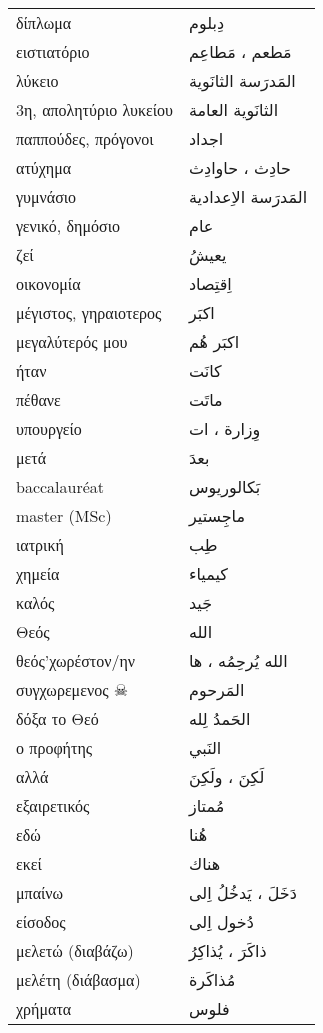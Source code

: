 \documentclass[twocolumn,a4paper]{article}
\newcommand{\ar}[1]{\textarabic{#1}}
\newcommand{\pl}{\raisebox{0.15ex}{\footnotesize ◍}}
\newcommand{\normpl}[1]{\ar{ #1، ات }}
\newcommand{\vrf}{\raisebox{0.15ex}{\footnotesize ◉}}
\newcommand{\vr}{\raisebox{0.15ex}{\footnotesize ◎}}
\newcommand{\mas}{\raisebox{0.15ex}{\footnotesize ◫}}
\begin{document}
\begin{mpsupertabular}{ P{0.5\textwidth} P{0.5\textwidth} }
δίπλωμα        & \ar{ دِبلوم } \\
ειστιατόριο \pl & \ar{ مَطعم ، مَطاعِم } \\
λύκειο         & \ar{ المَدرَسة الثانَوية } \\
3η, απολητύριο λυκείου & \ar{ الثانَوية العامة } \\
παππούδες, πρόγονοι & \ar{ اجداد } \\
ατύχημα  \pl   & \ar{ حادِث ، حاوادِث } \\
γυμνάσιο       & \ar{ المَدرَسة الاِعدادية } \\
γενικό, δημόσιο & \ar{ عام } \\
ζεί \vr        & \ar{ يعيشُ } \\
οικονομία      & \ar{ اِقتِصاد } \\
μέγιστος, γηραιοτερος & \ar{ اكبَر } \\
μεγαλύτερός μου & \ar{ اكبَر هُم } \\
ήταν \vr       & \ar{ كانَت } \\
πέθανε \vr     & \ar{ ماتَت } \\
υπουργείο \pl  & \normpl{ وِزارة } \\
μετά           & \ar{ بعدَ } \\
baccalauréat   & \ar{ بَكالوريوس } \\
master (MSc)   & \ar{ ماجِستير } \\
ιατρική        & \ar{ طِب } \\
χημεία         & \ar{ كيمياء } \\
καλός          & \ar{ جَيد } \\
Θεός           & \ar{ الله } \\
θεός'χωρέστον/ην & \ar{ الله يُرحِمُه ، ها } \\
συγχωρεμενος \normalsize{☠} & \ar{ المَرحوم } \\
δόξα το Θεό    & \ar{ الحَمدُ لِله } \\

ο προφήτης     & \ar{ النَبي } \\
αλλά           & \ar{ لَكِنَ ، ولَكِنَ } \\
εξαιρετικός    & \ar{ مُمتاز } \\
εδώ            & \ar{ هُنا } \\
εκεί           & \ar{ هناك } \\
μπαίνω \vrf    & \ar{ دَخَلَ ، يَدخُلُ اِلى } \\
είσοδος \mas   & \ar{ دُخول اِلى } \\
μελετώ (διαβάζω) \vrf & \ar{ ذاكَرَ ، يُذاكِرُ } \\
μελέτη (διάβασμα) \mas & \ar{ مُذاكَرة } \\
χρήματα        & \ar{ فلوس } \\


\end{mpsupertabular}
\end{document}
